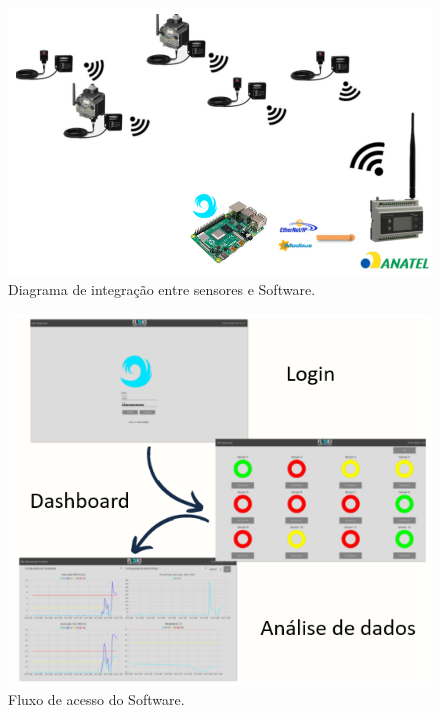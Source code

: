 \begin{figure}[H]
    \caption{Diagrama de integração entre sensores e Software.}
    \begin{center}
        \includegraphics[scale=0.5]{metodologia/img/layout.PNG}
    \end{center}
    \label{fig:sensor_exaustor}
\end{figure}

\begin{figure}[H]
    \caption{Fluxo de acesso do Software.}
    \begin{center}
        \includegraphics[scale=0.8]{metodologia/img/fluxo_software.PNG}
    \end{center}
    \label{fig:sensor_exaustor}
\end{figure}



